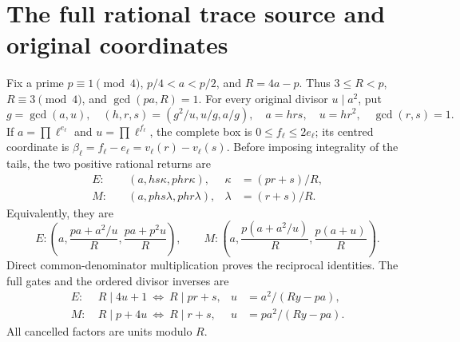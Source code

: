 \section{The full rational trace source and original coordinates}\label{sec:source}
Fix a prime $p\equiv1\pmod4$, $p/4<a<p/2$, and $R=4a-p$. Thus
$3\le R<p$, $R\equiv3\pmod4$, and $\gcd(pa,R)=1$.
For every original divisor $u\mid a^2$, put
\[
 g=\gcd(a,u),\quad (h,r,s)=(g^2/u,u/g,a/g),\quad
 a=hrs,\quad u=hr^2,\quad \gcd(r,s)=1.
\]
If $a=\prod\ell^{e_\ell}$ and $u=\prod\ell^{f_\ell}$, the complete box is
$0\le f_\ell\le2e_\ell$; its centred coordinate is
$\beta_\ell=f_\ell-e_\ell=v_\ell(r)-v_\ell(s)$.
Before imposing integrality of the tails, the two positive rational returns are
\begin{align}
 E:\quad &(a,hs\kappa,phr\kappa),&\kappa&=(pr+s)/R,\label{eq:E}\\
 M:\quad &(a,phs\lambda,phr\lambda),&\lambda&=(r+s)/R.\label{eq:M}
\end{align}
Equivalently, they are
\[
 E:\left(a,\frac{pa+a^2/u}{R},\frac{pa+p^2u}{R}\right),\qquad
 M:\left(a,\frac{p(a+a^2/u)}R,\frac{p(a+u)}R\right).
\]
Direct common-denominator multiplication proves the reciprocal identities.
The full gates and the ordered divisor inverses are
\begin{align*}
 E:&\ R\mid4u+1\ \Longleftrightarrow\ R\mid pr+s,
 &u&=a^2/(Ry-pa),\\
 M:&\ R\mid p+4u\ \Longleftrightarrow\ R\mid r+s,
 &u&=pa^2/(Ry-pa).
\end{align*}
All cancelled factors are units modulo $R$.

